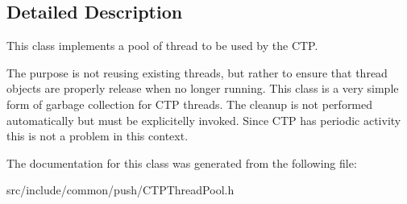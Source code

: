 \subsection{Detailed Description}
This class implements a pool of thread to be used by the CTP. 

The purpose is not reusing existing threads, but rather to ensure that thread objects are properly release when no longer running. This class is a very simple form of garbage collection for CTP threads. The cleanup is not performed automatically but must be explicitelly invoked. Since CTP has periodic activity this is not a problem in this context. 



The documentation for this class was generated from the following file:\begin{CompactItemize}
\item 
src/include/common/push/CTPThread\-Pool.h\end{CompactItemize}
